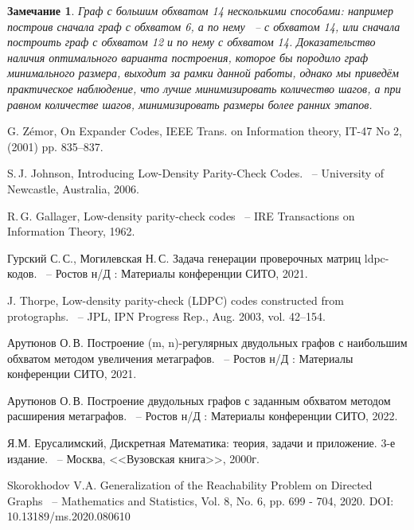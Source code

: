 \documentclass[14pt]{mmcs-article}
\newtheorem{notice}{Замечание}
\begin{document}
\begin{notice}
    Граф с большим обхватом 14 несколькими способами: например построив сначала граф с обхватом 6, а по нему ~-- с обхватом 14, или сначала построить граф с обхватом 12 и по нему с обхватом 14. Доказательство наличия оптимального варианта построения, которое бы породило граф минимального размера, выходит за рамки данной работы, однако мы приведём практическое наблюдение, что лучше минимизировать количество шагов, а при равном количестве шагов, минимизировать размеры более ранних этапов.
\end{notice}

\newpage

\renewcommand{\refname}{\centering \textbf{Литература}}

\begin{thebibliography}{0}

G. Zémor, On Expander Codes, IEEE Trans. on Information theory, IT-47
No 2, (2001) pp. 835–837.
  
S.\,J. Johnson,
Introducing Low-Density Parity-Check Codes.
~-- University of Newcastle, Australia, 2006.

R.\,G. Gallager,
Low-density parity-check codes
~-- IRE Transactions on Information Theory, 1962.

Гурский С.\,С., Могилевская Н.\,С.
Задача генерации проверочных матриц ldpc-кодов.
~-- Ростов н/Д : Материалы конференции СИТО, 2021.

J. Thorpe,
Low-density parity-check (LDPC) codes constructed from protographs.
~-- JPL, IPN Progress Rep., Aug. 2003, vol. 42–154.

Арутюнов О.\,В.
Построение (m, n)-регулярных двудольных графов с наибольшим обхватом методом увеличения метаграфов.
~-- Ростов н/Д : Материалы конференции СИТО, 2021.

Арутюнов О.\,В.
Построение двудольных графов с заданным обхватом методом расширения метаграфов.
~-- Ростов н/Д : Материалы конференции СИТО, 2022.

Я.М. Ерусалимский,
Дискретная Математика: теория, задачи и приложение. 3-е издание.
~-- Москва, <<Вузовская книга>>, 2000г.

Skorokhodov V.A. Generalization of the Reachability Problem on Directed Graphs
~-- Mathematics and Statistics, Vol. 8, No. 6, pp. 699 - 704, 2020. DOI: 10.13189/ms.2020.080610

\end{thebibliography}
\end{document}
